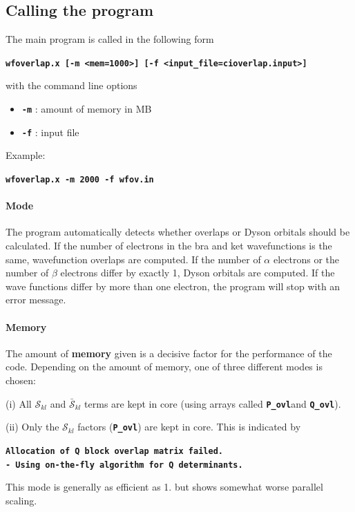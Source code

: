 \documentclass[a4paper,10pt,DIV=15,openany,twoside=false]{scrbook}
\newcommand{\ttt}[1]{\textbf{\texttt{#1}}}
\newenvironment{example}{
  \setlength{\OuterFrameSep}{3pt}
  \vspace{0mm}
  \definecolor{shadecolor}{HTML}{E4F4FF}
  \begin{shaded}
}{
  \end{shaded}
}
\begin{document}
\subsection{Calling the program}
The main program is called in the following form
%
\begin{example}
\ttt{wfoverlap.x [-m <mem=1000>] [-f <input\_file=cioverlap.input>]}
\end{example}
%
with the command line options
%
\begin{itemize}
\item \ttt{-m} : amount of memory in MB
\item \ttt{-f} : input file
\end{itemize}

Example:
\begin{example}
\ttt{wfoverlap.x -m 2000 -f wfov.in}
\end{example}

\paragraph{Mode}

The program automatically detects whether overlaps or Dyson orbitals should be calculated.
If the number of electrons in the bra and ket wavefunctions is the same, wavefunction overlaps are computed.
If the number of $\alpha$ electrons or the number of $\beta$ electrons differ by exactly 1, Dyson orbitals are computed.
If the wave functions differ by more than one electron, the program will stop with an error message.

\paragraph{Memory}

The amount of \textbf{memory} given is a decisive factor for the performance of the code.
Depending on the amount of memory, one of three different modes is chosen:

(i) All $\mathcal{S}_{kl}$ and $\bar{\mathcal{S}}_{kl}$ terms are kept in core (using arrays called \ttt{P\_ovl}and \ttt{Q\_ovl}).

(ii) Only the $\mathcal{S}_{kl}$ factors (\ttt{P\_ovl}) are kept in core. This is indicated by
\begin{example}
\ttt{Allocation of Q block overlap matrix failed.\\
  - Using on-the-fly algorithm for Q determinants.}
\end{example}
This mode is generally as efficient as 1. but shows somewhat worse parallel scaling.
\end{document}
